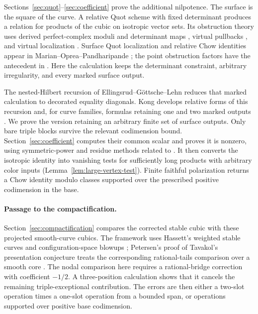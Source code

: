 Sections~\ref{sec:quot}--\ref{sec:coefficient} prove the additional
nilpotence. The surface is the square of the curve. A relative
Quot scheme with fixed determinant produces a relation for products
of the cubic on isotropic vector sets. Its obstruction theory uses
derived perfect-complex moduli and determinant maps \cite{TV,STV},
virtual pullbacks \cite{BF,Manolache}, and virtual localization
\cite{GP}. Surface Quot localization and relative Chow identities
appear in Marian--Oprea--Pandharipande \cite{MOPSegre}; the point
obstruction factors have the antecedent in
\cite[Lemma~34 and Section~5.2]{OPQuot}.
Here the calculation keeps the determinant constraint, arbitrary
irregularity, and every marked surface output.

The nested-Hilbert recursion of Ellingsrud--G\"ottsche--Lehn
\cite{EGL} reduces that marked calculation to decorated equality
diagonals. Kong develops relative forms of this recursion and, for
curve families, formulas retaining one and two marked outputs
\cite[Section~2.1 and Lemma~3.4]{Kong2026}.
We prove the version retaining an arbitrary finite set of surface
outputs. Only bare triple blocks survive the relevant codimension
bound. Section~\ref{sec:coefficient} computes their common scalar and
proves it is nonzero, using symmetric-power and residue methods related
to \cite[Equation~(9), Theorem~2, and Lemma~3]{MOPCombinatorics}.
It then converts the isotropic identity into vanishing tests for
sufficiently long products with arbitrary color inputs
(Lemma~\ref{lem:large-vertex-test}). Finite faithful polarization returns
a Chow identity modulo classes supported over the prescribed positive
codimension in the base.

\paragraph{Passage to the compactification.}
Section~\ref{sec:compactification} compares the corrected stable cubic
with these projected smooth-curve cubics. The framework uses Hassett's
weighted stable curves \cite{Hassett} and configuration-space blowups
\cite{FultonMacPherson,Routis}; Petersen's proof of Tavakol's
presentation conjecture treats the corresponding rational-tails
comparison over a smooth core \cite{TavakolRT,PetersenWonderful}.
The nodal comparison here requires a rational-bridge correction with
coefficient \(-1/2\). A three-position calculation shows that it
cancels the remaining triple-exceptional contribution. The errors are
then either a two-slot operation times a one-slot operation from a
bounded span, or operations supported over positive base codimension.

